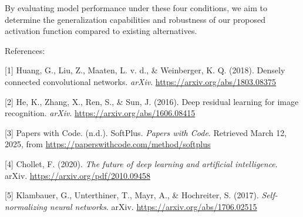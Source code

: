 \documentclass{article}
\begin{document}
By evaluating model performance under these four conditions, we aim to determine the generalization capabilities and robustness of our proposed activation function compared to existing alternatives.


\maketitle
References:

[1] Huang, G., Liu, Z., Maaten, L. v. d., \& Weinberger, K. Q. (2018). Densely connected convolutional networks. \textit{arXiv}. \href{https://arxiv.org/abs/1803.08375}{https://arxiv.org/abs/1803.08375} 

[2] He, K., Zhang, X., Ren, S., \& Sun, J. (2016). Deep residual learning for image recognition. \textit{arXiv}. \href{https://arxiv.org/abs/1606.08415}{https://arxiv.org/abs/1606.08415} 

[3] Papers with Code. (n.d.). SoftPlus. \textit{Papers with Code}. Retrieved March 12, 2025, from \href{https://paperswithcode.com/method/softplus}{https://paperswithcode.com/method/softplus} 

[4] Chollet, F. (2020). \textit{The future of deep learning and artificial intelligence}. arXiv. \href{https://arxiv.org/pdf/2010.09458}{https://arxiv.org/pdf/2010.09458} 

[5] Klambauer, G., Unterthiner, T., Mayr, A., \& Hochreiter, S. (2017). \textit{Self-normalizing neural networks}. arXiv. \href{https://arxiv.org/abs/1706.02515}{https://arxiv.org/abs/1706.02515} 
\end{document}
